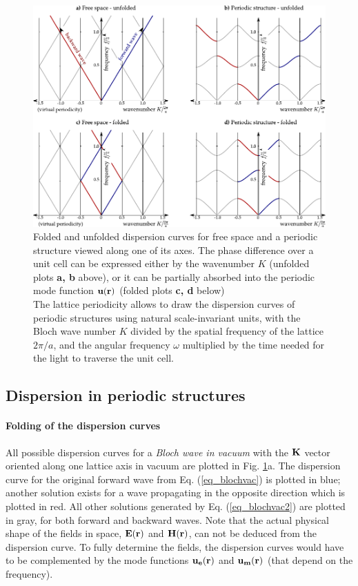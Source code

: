 \begin{figure}[ht] \caption{Folded and unfolded dispersion curves for free space and a periodic structure viewed along one of its axes. The phase difference over a unit cell can be expressed either by the wavenumber $K$ (unfolded plots \textbf{a, b} above), or it can be partially absorbed into the periodic mode function $\mathbf{u}({\mathbf{r}})$ (folded plots \textbf{c, d} below)\\
The lattice periodicity allows to draw the dispersion curves of periodic structures using natural scale-invariant units, with the Bloch wave number $K$ divided by the spatial frequency of the lattice $2\pi/a$, and the angular frequency $\omega$ multiplied by the time needed for the light to traverse the unit cell.
} \label{fg_phcfolding} \centering  %
	\includegraphics[width=\textwidth]{img/PhC_folding_illustration.pdf} 
\end{figure}
\clearpage


\subsection{Dispersion in periodic structures}
\paragraph{Folding of the dispersion curves} %
All possible dispersion curves for a \textit{Bloch wave in vacuum} with the ${\mathbf{K}}$ vector oriented along one lattice axis in vacuum are plotted in Fig. \ref{fg_phcfolding}a. The dispersion curve for the original forward wave from Eq. (\ref{eq_blochvac}) is plotted in blue; another solution exists for a wave propagating in the opposite direction which is plotted in red. All other solutions generated by Eq. (\ref{eq_blochvac2}) are plotted in gray, for both forward and backward waves. 
Note that the actual physical shape of the fields in space,  $\mathbf{E}({\mathbf{r}})$ and $\mathbf{H}({\mathbf{r}})$, can not be deduced from the dispersion curve. To fully determine the fields, the dispersion curves would have to be complemented by the mode functions $\mathbf{u_e}({\mathbf{r}})$ and $\mathbf{u_m}({\mathbf{r}})$ (that depend on the frequency). 

